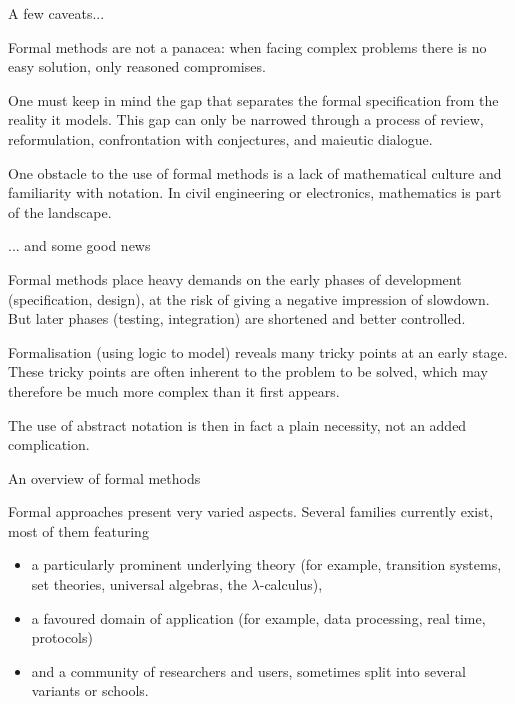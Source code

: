 \documentclass[compress,dvips,xcolor={dvipsnames},t]{beamer}
\begin{document}
%
\begin{frame}{A few caveats...}

  Formal methods are not a panacea: when facing complex problems there
  is no easy solution, only reasoned compromises.

  \bigskip

  One must keep in mind the gap that separates the formal
  specification from the reality it models. This gap can only be
  narrowed through a process of review, reformulation, confrontation
  with conjectures, and maieutic dialogue.

  \bigskip

  One obstacle to the use of formal methods is a lack of mathematical
  culture and familiarity with notation. In civil engineering or
  electronics, mathematics is part of the landscape.

\end{frame}

%
\begin{frame}{... and some good news}

  Formal methods place heavy demands on the early phases of
  development (specification, design), at the risk of giving a
  negative impression of slowdown. But later phases (testing,
  integration) are shortened and better controlled.

  \bigskip

  Formalisation (using logic to model) reveals many tricky points at
  an early stage. These tricky points are often inherent to the
  problem to be solved, which may therefore be much more complex than
  it first appears.

  \bigskip

  The use of abstract notation is then in fact a plain necessity, not
  an added complication.

\end{frame}

%
\begin{frame}{An overview of formal methods}

Formal approaches present very varied aspects. Several families
currently exist, most of them featuring

\begin{itemize}

  \item a particularly prominent underlying theory (for example,
  transition systems, set theories, universal algebras, the
  $\lambda$-calculus),

  \item a favoured domain of application (for example, data
  processing, real time, protocols)

  \item and a community of researchers and users, sometimes split
  into several variants or schools.

\end{itemize}

\end{frame}
\end{document}
